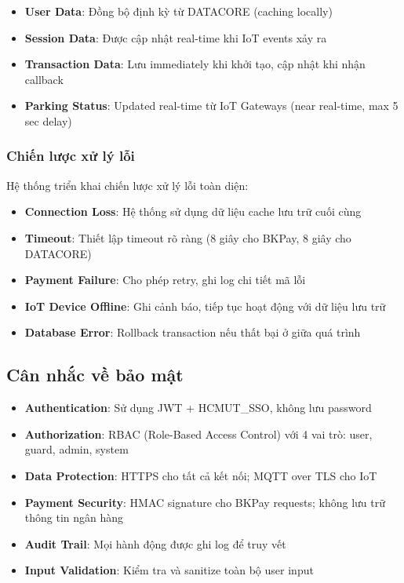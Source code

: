 \begin{itemize}
    \item \textbf{User Data}: Đồng bộ định kỳ từ DATACORE (caching locally)
    \item \textbf{Session Data}: Được cập nhật real-time khi IoT events xảy ra
    \item \textbf{Transaction Data}: Lưu immediately khi khởi tạo, cập nhật khi nhận callback
    \item \textbf{Parking Status}: Updated real-time từ IoT Gateways (near real-time, max 5 sec delay)
\end{itemize}

\subsubsection{Chiến lược xử lý lỗi}

Hệ thống triển khai chiến lược xử lý lỗi toàn diện:

\begin{itemize}
    \item \textbf{Connection Loss}: Hệ thống sử dụng dữ liệu cache lưu trữ cuối cùng
    \item \textbf{Timeout}: Thiết lập timeout rõ ràng (8 giây cho BKPay, 8 giây cho DATACORE)
    \item \textbf{Payment Failure}: Cho phép retry, ghi log chi tiết mã lỗi
    \item \textbf{IoT Device Offline}: Ghi cảnh báo, tiếp tục hoạt động với dữ liệu lưu trữ
    \item \textbf{Database Error}: Rollback transaction nếu thất bại ở giữa quá trình
\end{itemize}

\subsection{Cân nhắc về bảo mật}

\begin{itemize}
    \item \textbf{Authentication}: Sử dụng JWT + HCMUT\_SSO, không lưu password
    \item \textbf{Authorization}: RBAC (Role-Based Access Control) với 4 vai trò: user, guard, admin, system
    \item \textbf{Data Protection}: HTTPS cho tất cả kết nối; MQTT over TLS cho IoT
    \item \textbf{Payment Security}: HMAC signature cho BKPay requests; không lưu trữ thông tin ngân hàng
    \item \textbf{Audit Trail}: Mọi hành động được ghi log để truy vết
    \item \textbf{Input Validation}: Kiểm tra và sanitize toàn bộ user input
\end{itemize}

